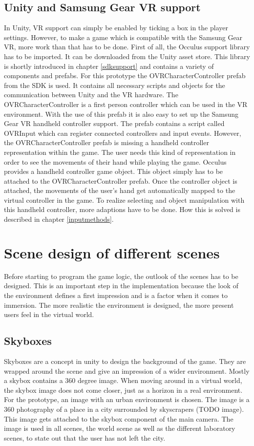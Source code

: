 \subsection{Unity and Samsung Gear VR support}
In Unity, VR support can simply be enabled by ticking a box in the player settings. However, to make a game which is compatible with the Samsung Gear VR, more work than that has to be done. First of all, the Occulus support library has to be imported. It can be downloaded from the Unity asset store. This library is shortly introduced in chapter \ref{sdksupport} and contains a variety of components and prefabs. For this prototype the OVRCharacterController prefab from the SDK is used. It contains all necessary scripts and objects for the communication between Unity and the VR hardware. The OVRCharacterController is a first person controller which can be used in the VR environment. With the use of this prefab it is also easy to set up the Samsung Gear VR handheld controller support. The prefab contains a script called OVRInput which can register connected controllers and input events. However, the OVRCharacterController prefab is missing a handheld controller representation within the game. The user needs this kind of representation in order to see the movements of their hand while playing the game. Occulus provides a handheld controller game object. This object simply has to be attached to the OVRCharacterController prefab. Once the controller object is attached, the movements of the user's hand get automatically mapped to the virtual controller in the game. To realize selecting and object manipulation with this handheld controller, more adaptions have to be done. How this is solved is described in chapter \ref{inputmethods}.

\section{Scene design of different scenes}
Before starting to program the game logic, the outlook of the scenes has to be designed. This is an important step in the implementation because the look of the environment defines a first impression and is a factor when it comes to immersion. The more realistic the environment is designed, the more present users feel in the virtual world.
\subsection{Skyboxes}
Skyboxes are a concept in unity to design the background of the game. They are wrapped around the scene and give an impression of a wider environment. Mostly a skybox contains a 360 degree image. When moving around in a virtual world, the skybox image does not come closer, just as a horizon in a real environment.\\
For the prototype, an image with an urban environment is chosen. The image is a 360 photography of a place in a city surrounded by skyscrapers (TODO image). This image gets attached to the skybox component of the main camera. The image is used in all scenes, the world scene as well as the different laboratory scenes, to state out that the user has not left the city.
